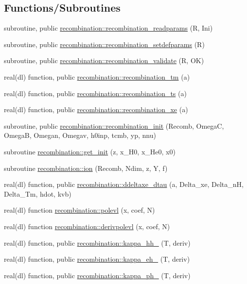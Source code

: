 \subsection*{Functions/\+Subroutines}
\begin{DoxyCompactItemize}
\item 
subroutine, public \mbox{\hyperlink{namespacerecombination_a30d82e415adca06a256aae1be85e72a1}{recombination\+::recombination\+\_\+readparams}} (R, Ini)
\item 
subroutine, public \mbox{\hyperlink{namespacerecombination_aafff8339a994ad18b5b4187d9d4faa40}{recombination\+::recombination\+\_\+setdefparams}} (R)
\item 
subroutine, public \mbox{\hyperlink{namespacerecombination_aaaea2371b700336e16f08b64b6dd44d9}{recombination\+::recombination\+\_\+validate}} (R, OK)
\item 
real(dl) function, public \mbox{\hyperlink{namespacerecombination_a8d7b99ebe97a13f83da41d8d9b8215e2}{recombination\+::recombination\+\_\+tm}} (a)
\item 
real(dl) function, public \mbox{\hyperlink{namespacerecombination_ae89b19e4ef4ab84e9724ee4a4d2435fc}{recombination\+::recombination\+\_\+ts}} (a)
\item 
real(dl) function, public \mbox{\hyperlink{namespacerecombination_a64de24be26a98919cba0095322731263}{recombination\+::recombination\+\_\+xe}} (a)
\item 
subroutine, public \mbox{\hyperlink{namespacerecombination_ac2325c42e3b77187a31f6810929de147}{recombination\+::recombination\+\_\+init}} (Recomb, OmegaC, OmegaB, Omegan, Omegav, h0inp, tcmb, yp, nnu)
\item 
subroutine \mbox{\hyperlink{namespacerecombination_a7c190d70dfd56d14181b4ae8535dcd4d}{recombination\+::get\+\_\+init}} (z, x\+\_\+\+H0, x\+\_\+\+He0, x0)
\item 
subroutine \mbox{\hyperlink{namespacerecombination_a5f644f40f1384d3dd16e675369854f63}{recombination\+::ion}} (Recomb, Ndim, z, Y, f)
\item 
real(dl) function, public \mbox{\hyperlink{namespacerecombination_a7445052618f5f8ed0d793a58eb66c768}{recombination\+::ddeltaxe\+\_\+dtau}} (a, Delta\+\_\+xe, Delta\+\_\+nH, Delta\+\_\+\+Tm, hdot, kvb)
\item 
real(dl) function \mbox{\hyperlink{namespacerecombination_abd7e507e301ec237a76ea22d6a6be0eb}{recombination\+::polevl}} (x, coef, N)
\item 
real(dl) function \mbox{\hyperlink{namespacerecombination_aae74849488f7c602dd70b57a9e9782f2}{recombination\+::derivpolevl}} (x, coef, N)
\item 
real(dl) function, public \mbox{\hyperlink{namespacerecombination_a6456c5ea7f228fa74eba8e54de9eded5}{recombination\+::kappa\+\_\+hh\+\_\+21cm}} (T, deriv)
\item 
real(dl) function, public \mbox{\hyperlink{namespacerecombination_ad379abd3309c2fd3f5cacb8b614b80a5}{recombination\+::kappa\+\_\+eh\+\_\+21cm}} (T, deriv)
\item 
real(dl) function, public \mbox{\hyperlink{namespacerecombination_a27e7c8f022215a5bb27a45d2b5db20bb}{recombination\+::kappa\+\_\+ph\+\_\+21cm}} (T, deriv)
\end{DoxyCompactItemize}
